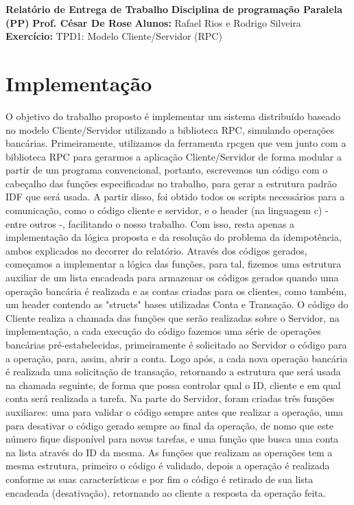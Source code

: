 \documentclass{article}
\begin{document}
\begin{multicols*}{2}
\textbf{Relatório de Entrega de Trabalho} \newline
\textbf{Disciplina de programação Paralela (PP)}\newline 
\textbf{Prof. César De Rose} \newline
\textbf{Alunos:} Rafael Rios e Rodrigo Silveira \newline
\textbf{Exercício:} TPD1: Modelo Cliente/Servidor (RPC) \newline

\section{Implementação}

O objetivo do trabalho proposto é implementar um sistema distribuído baseado no modelo Cliente/Servidor utilizando a biblioteca RPC, simulando operações bancárias. Primeiramente, utilizamos da ferramenta rpcgen que vem junto com a biblioteca RPC para gerarmos a aplicação Cliente/Servidor de forma modular a partir de um programa convencional, portanto, escrevemos um código com o cabeçalho das funções especificadas no trabalho, para gerar a estrutura padrão IDF que será usada. A partir disso, foi obtido todos os scripts necessários para a comunicação, como o código cliente e servidor, e o header (na linguagem c) - entre outros -, facilitando o nosso trabalho. Com isso, resta apenas a implementação da lógica proposta e da resolução do problema da idempotência, ambos explicados no decorrer do relatório.
\newline
Através dos códigos gerados, começamos a implementar a lógica das funções, para tal, fizemos uma estrutura auxiliar de um lista encadeada para armazenar os códigos gerados quando uma operação bancária é realizada e as contas criadas para os clientes, como também, um header contendo as "structs" bases utilizadas Conta e Transação. O código do Cliente realiza a chamada das funções que serão realizadas sobre o Servidor, na implementação, a cada execução do código fazemos uma série de operações bancárias pré-estabelecidas, primeiramente é solicitado ao Servidor o código para a operação, para, assim, abrir a conta. Logo após, a cada nova operação bancária é realizada uma solicitação de transação, retornando a estrutura que será usada na chamada seguinte, de forma que possa controlar qual o ID, cliente e em qual conta será realizada a tarefa. \newline
Na parte do Servidor, foram criadas três funções auxiliares: uma para validar o código sempre antes que realizar a operação, uma para desativar o código gerado sempre ao final da operação, de nomo que este número fique disponível para novas tarefas, e uma função que busca uma conta na lista através do ID da mesma. As funções que realizam as operações tem a mesma estrutura, primeiro o código é validado, depois a operação é realizada conforme as suas características e por fim o código é retirado de sua lista encadeada (desativação), retornando ao cliente a resposta da operação feita.

\end{multicols*}
\end{document}
